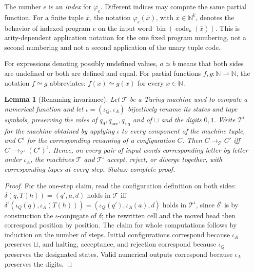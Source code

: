 \documentclass[11pt,oneside,openany]{book}
\theoremstyle{definition}
\theoremstyle{plain}
\newtheorem{lemma}[definition]{Lemma}
\theoremstyle{remark}
\newcommand{\N}{\mathbb{N}}
\begin{document}
The number \(e\) is an \emph{index} for \(\varphi_e\).  Different indices may
compute the same partial function.  For a finite tuple \(\bar x\), the notation
\(\varphi_e(\bar x)\), with \(\bar x\in\N^k\), denotes the behavior of indexed
program \(e\) on the input word
\(\operatorname{bin}(\operatorname{code}_k(\bar x))\).  This is
arity-dependent application notation for the one fixed program numbering, not
a second numbering and not a second application of the unary tuple code.

For expressions denoting possibly undefined values, \(a\simeq b\) means that
both sides are undefined or both are defined and equal.  For partial
functions \(f,g:\N\rightharpoonup\N\), the notation \(f\simeq g\)
abbreviates: \(f(x)\simeq g(x)\) for every \(x\in\N\).

\begin{lemma}[Renaming invariance]
\label{lem:renaming-invariance}
Let \(\mathcal T\) be a Turing machine used to compute a numerical function
and let \(\iota=(\iota_Q,\iota_A)\) bijectively rename its states and tape
symbols, preserving the roles of
\(q_0,q_{\mathrm{acc}},q_{\mathrm{rej}}\) and of \(\sqcup\) and the digits
\(0,1\).  Write \(\mathcal T^{\iota}\) for the machine obtained by applying
\(\iota\) to every component of the machine tuple, and \(C^{\iota}\) for the
corresponding renaming of a configuration \(C\).  Then
\(C\longrightarrow_{\mathcal T}C'\) iff
\(C^{\iota}\longrightarrow_{\mathcal T^{\iota}}(C')^{\iota}\).  Hence, on
every pair of input words corresponding letter by letter under \(\iota_A\),
the machines \(\mathcal T\) and \(\mathcal T^{\iota}\) accept, reject, or
diverge together, with corresponding tapes at every step.
\textit{Status: complete proof.}
\end{lemma}

\begin{proof}
For the one-step claim, read the configuration definition on both sides:
\(\delta(q,T(h))=(q',a,d)\) holds in \(\mathcal T\) iff
\(\delta^{\iota}(\iota_Q(q),\iota_A(T(h)))
=(\iota_Q(q'),\iota_A(a),d)\) holds in \(\mathcal T^{\iota}\), since
\(\delta^{\iota}\) is by construction the \(\iota\)-conjugate of \(\delta\);
the rewritten cell and the moved head then correspond position by position.
The claim for whole computations follows by induction on the number of
steps.  Initial configurations correspond because \(\iota_A\) preserves
\(\sqcup\), and halting, acceptance, and rejection correspond because
\(\iota_Q\) preserves the designated states.  Valid numerical outputs
correspond because \(\iota_A\) preserves the digits.
\end{proof}
\end{document}
